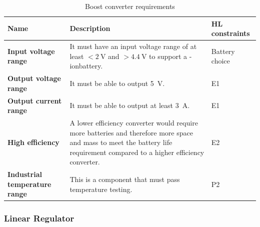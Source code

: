 \documentclass{report}
\newcommand{\liion}{\ce{Li}-ion}
\begin{document}
\begin{table}[H]
  \centering
  \begin{tabular}{|L{0.2\textwidth}|L{0.495\textwidth}|L{0.2\textwidth}|}
    \hline
    \textbf{Name}                         & \textbf{Description}                                                                                                                                                        & \textbf{HL constraints} \\ \hline
    \textbf{Input voltage range}          & It must have an input voltage range of at least $<\SI{2}{\volt}$ and $>\SI{4.4}{\volt}$ to support a \liion battery.                                                        & Battery choice          \\\hline
    \textbf{Output voltage range}         & It must be able to output \SI{5}{\volt}.                                                                                                                                    & E1                      \\\hline
    \textbf{Output current range}         & It must be able to output at least \SI{3}{\ampere}.                                                                                                                         & E1                      \\\hline
    \textbf{High efficiency}              & A lower efficiency converter would require more batteries and therefore more space and mass to meet the battery life requirement compared to a higher efficiency converter. & E2                      \\\hline
    \textbf{Industrial temperature range} & This is a component that must pass temperature testing.                                                                                                                     & P2                      \\\hline
  \end{tabular}
  \caption{Boost converter requirements}
  \label{tabl:boost-requirements}
\end{table}

\subsubsection{Linear Regulator}
\end{document}
